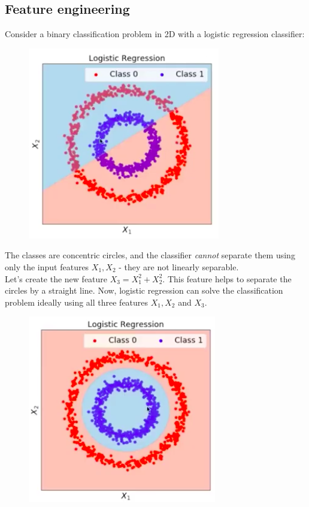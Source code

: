 \subsection{Feature engineering}
\begin{frameex}
Consider a binary classification problem in 2D with a logistic regression classifier:
\begin{figure}[H]
\centering
\includegraphics[scale=0.4]{circles.png}
\end{figure}
The classes are concentric circles, and the classifier \textit{cannot} separate them using only the input features $X_1, X_2$ - they are not linearly separable.\\

Let's create the new feature $X_3 = X_1^2 + X_2^2$. This feature helps to separate the circles by a straight line. Now, logistic regression can solve the classification problem ideally using all three features $X_1, X_2$ and $X_3$. 

\begin{figure}[H]
\centering
\includegraphics[scale=0.4]{circles2.png}

\end{figure}
\end{frameex}

